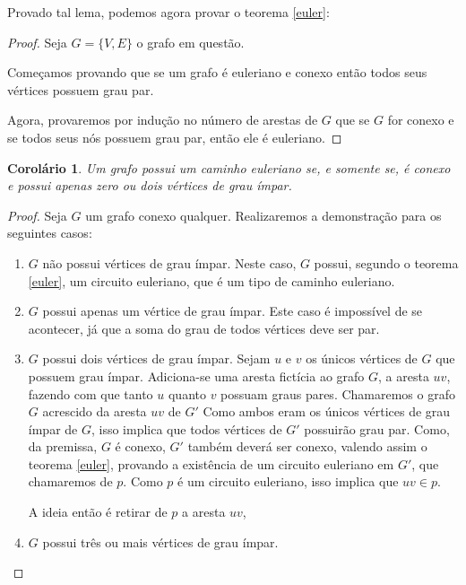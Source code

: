 \documentclass{article}
\newtheorem{corollary}{Corolário}
\begin{document}

Provado tal lema, podemos agora provar o teorema \ref{euler}:

\begin{proof}

Seja $G = \{V, E\}$ o grafo em questão.

Começamos provando que se um grafo é euleriano e conexo então todos seus vértices possuem grau par.


Agora, provaremos por indução no número de arestas de $G$ que se $G$ for conexo e se todos seus nós possuem grau par, então ele é euleriano.


\end{proof}

\begin{corollary}
    Um grafo possui um caminho euleriano se, e somente se, é conexo e possui apenas zero ou dois vértices de grau ímpar.
\end{corollary}

\begin{proof}
    Seja $G$ um grafo conexo qualquer. Realizaremos a demonstração para os seguintes casos:
    \begin{enumerate}
        \item $G$ não possui vértices de grau ímpar. Neste caso, $G$ possui, segundo o teorema \ref{euler}, um circuito euleriano, que é um tipo de caminho euleriano.
        
        \item $G$ possui apenas um vértice de grau ímpar. Este caso é impossível de se acontecer, já que a soma do grau de todos vértices deve ser par.
        
        \item $G$ possui dois vértices de grau ímpar. 
        Sejam $u$ e $v$ os únicos vértices de $G$ que possuem grau ímpar.
        Adiciona-se uma aresta fictícia ao grafo $G$, a aresta $uv$, fazendo com que tanto $u$ quanto $v$ possuam graus pares. Chamaremos o grafo $G$ acrescido da aresta $uv$ de $G'$
        Como ambos eram os únicos vértices de grau ímpar de $G$, isso implica que todos vértices de $G'$ possuirão grau par. 
        Como, da premissa, $G$ é conexo, $G'$ também deverá ser conexo, valendo assim o teorema \ref{euler}, provando a existência de um circuito euleriano em $G'$, que chamaremos de $p$.
        Como $p$ é um circuito euleriano, isso implica que $uv \in p$.
        
        A ideia então é retirar de $p$ a aresta $uv$, 

        \item $G$ possui três ou mais vértices de grau ímpar.
    \end{enumerate}
\end{proof}
\end{document}
